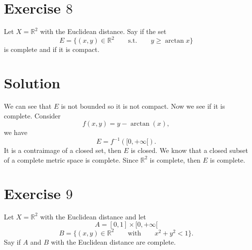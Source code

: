 \documentclass[a4paper, twoside, openany]{book}
\begin{document}
\section*{Exercise $8$}
Let $X = \mathbb{R}^2$ with the Euclidean distance. Say if the set
$$E = \{ (x,y) \in \mathbb{R}^2 \qquad \textrm{s.t.} \qquad y \geq \arctan{x} \}$$
is complete and if it is compact.
\section*{Solution}
\begin{figure}[!ht]
\begin{center}
\end{center}
\end{figure} \vspace{1 cm}
We can see that $E$ is not bounded so it is not compact. Now we see if it is complete. Consider
$$f(x,y) = y - \arctan(x),$$
we have
$$E = f^{-1}([0, +\infty[).$$
It is a contraimage of a closed set, then $E$ is closed. We know that a closed subset of a complete metric space is complete. Since $\mathbb{R}^2$ is complete, then $E$ is complete.
\clearpage
\section*{Exercise $9$}
Let $X = \mathbb{R}^2$ with the Euclidean distance and let
$$A = [0, 1] \times [0, +\infty[$$
$$B = \{ (x, y) \in \mathbb{R}^2 \qquad \textrm{with} \qquad x^2 + y^2 < 1 \}.$$
Say if $A$ and $B$ with the Euclidean distance are complete.
\end{document}
